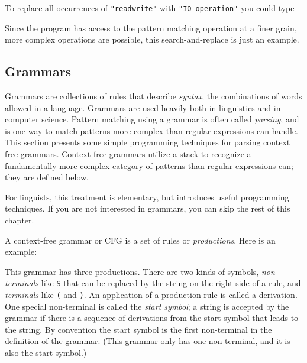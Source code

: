 To replace all occurrences of
\texttt{"read{\textbar}write"} with
\texttt{"IO operation"} you could type 


Since the program has access to the pattern matching operation at a
finer grain, more complex operations are possible, this
search-and-replace is just an example.

\subsection{Grammars}

Grammars are collections of rules that describe
\textit{syntax}, the combinations of words allowed in a
language. Grammars are used heavily both in linguistics and in computer
science. Pattern matching using a grammar is
often called \textit{parsing}, and is one way to match
patterns more complex than regular expressions can handle. This section
presents some simple programming techniques for parsing context free
grammars. Context free grammars utilize a stack to
recognize a fundamentally more complex category of patterns than
regular expressions can; they are defined below.

For linguists, this treatment is elementary, but introduces useful
programming techniques.
If you are not interested in grammars, you
can skip the rest of this chapter.

A context-free grammar or CFG is a set of
rules or \textit{productions}. Here is an example:


This grammar has three productions. There are two kinds of symbols,
\textit{non-terminals} like \texttt{S} that can be replaced by the
string on the right side of a rule, and \textit{terminals} like
\texttt{(} and \texttt{)}. An application of a production rule is called
a derivation. One special non-terminal is called the
\textit{start symbol}; a string is accepted by the grammar if there is a
sequence of derivations from the start symbol that leads to the string.
By convention the start symbol is the first non-terminal in the
definition of the grammar. (This grammar only has one non-terminal, and
it is also the start symbol.)

